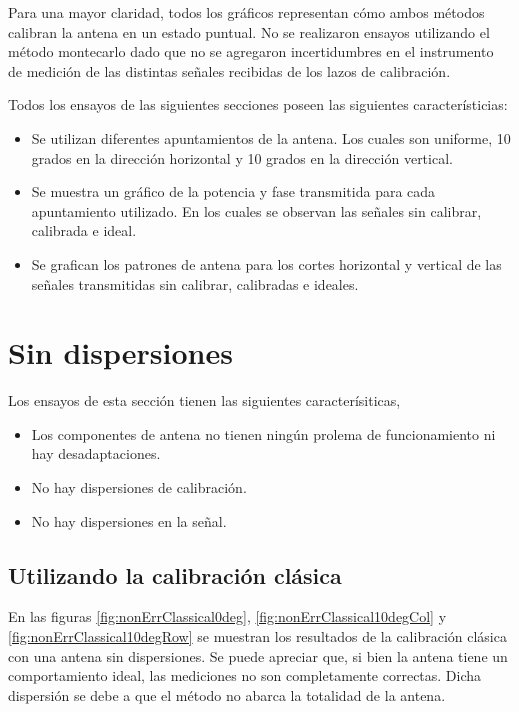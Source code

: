 Para una mayor claridad, todos los gráficos representan cómo ambos métodos calibran la antena en un estado puntual. No se 
realizaron ensayos utilizando el método montecarlo dado que no se agregaron incertidumbres en el instrumento de medición de las 
distintas señales recibidas de los lazos de calibración.

Todos los ensayos de las siguientes secciones poseen las siguientes característicias:
\begin{itemize}
	\item Se utilizan diferentes apuntamientos de la antena. Los cuales son uniforme, 10 grados en la dirección horizontal y 10 
		grados en la dirección vertical.
	\item Se muestra un gráfico de la potencia y fase transmitida para cada apuntamiento utilizado. En los cuales se observan las
		señales sin calibrar, calibrada e ideal. 
	\item Se grafican los patrones de antena para los cortes horizontal y vertical de las señales transmitidas sin calibrar, 
		calibradas e ideales.
\end{itemize}


\section{Sin dispersiones}

Los ensayos de esta sección tienen las siguientes caracterísiticas,
\begin{itemize}
	\item Los componentes de antena no tienen ningún prolema de funcionamiento ni hay desadaptaciones.
	\item No hay dispersiones de calibración.
	\item No hay dispersiones en la señal.
\end{itemize}

\subsection{Utilizando la calibración clásica}

En las figuras \ref{fig:nonErrClassical0deg}, \ref{fig:nonErrClassical10degCol} y \ref{fig:nonErrClassical10degRow} se muestran
los resultados de la calibración clásica con una antena sin dispersiones. Se puede apreciar que, si bien la antena tiene un 
comportamiento ideal, las mediciones no son completamente correctas. Dicha dispersión se debe a que el método no abarca la 
totalidad de la antena.


